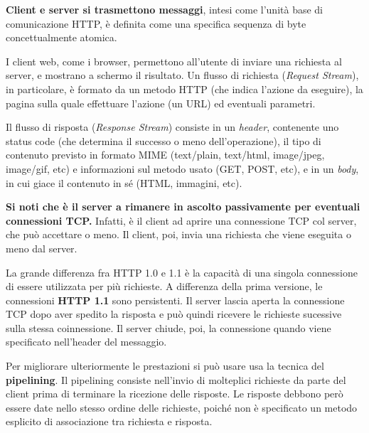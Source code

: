 \vspace{3mm}

\textbf{Client e server si trasmettono messaggi}, intesi come l’unità base di comunicazione HTTP, è definita come una specifica
sequenza di byte concettualmente atomica.

\vspace{3mm}

I client web, come i browser, permettono all'utente di inviare una richiesta al server, e mostrano a schermo il risultato. Un flusso di richiesta (\textit{Request Stream}), in particolare, è formato da un metodo HTTP (che indica l'azione da eseguire), la pagina sulla quale effettuare l'azione (un URL) ed eventuali parametri.

\vspace{3mm}

Il flusso di risposta (\textit{Response Stream}) consiste in un \textit{header}, contenente uno status code (che determina il successo o meno dell'operazione), il tipo di contenuto previsto in formato MIME (text/plain, text/html, image/jpeg, image/gif, etc) e informazioni sul metodo usato (GET, POST, etc), e in un \textit{body}, in cui giace il contenuto in sé (HTML, immagini, etc).

\vspace{3mm}

\textbf{Si noti che è il server a rimanere in ascolto passivamente per eventuali connessioni TCP.} Infatti, è il client ad aprire una connessione TCP col server, che può accettare o meno. Il client, poi, invia una richiesta che viene eseguita o meno dal server.

\vspace{3mm}

La grande differenza fra HTTP 1.0 e 1.1 è la capacità di una singola connessione di essere utilizzata per più richieste. A differenza della prima versione, le connessioni \textbf{HTTP 1.1} sono persistenti. Il server lascia aperta la connessione TCP dopo aver spedito la risposta e può quindi ricevere le richieste sucessive sulla stessa coinnessione. Il server chiude, poi, la connessione quando viene specificato nell'header del messaggio. 

\vspace{3mm}

Per migliorare ulteriormente le prestazioni si può usare usa la tecnica del \textbf{pipelining}. Il pipelining consiste nell’invio di molteplici richieste da parte del client prima di terminare la ricezione delle risposte. Le risposte debbono però essere date nello stesso ordine delle richieste, poiché non è specificato un metodo esplicito di associazione tra richiesta e risposta.

